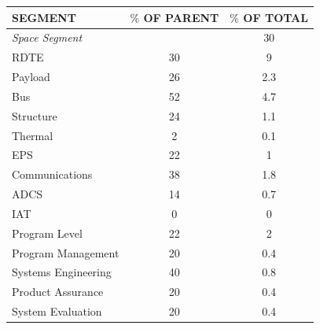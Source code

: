 \begin{table}[htbp]
	\centering

\begin{tabular}{p{10cm} | c | c }

   \textbf{SEGMENT} & \textbf{$\%$ OF PARENT} & \textbf{$\%$ OF TOTAL} \\ \hline \hline

\textsl{Space Segment} &          &       30   \\ \hline

      \hspace{1.0cm}RDTE &         30 &   9       \\ \hline

   \hspace{2.0cm}Payload &         26 &     2.3     \\

       \hspace{2.0cm}Bus &         52 &     4.7    \\ \hline

 \hspace{2.5cm}Structure &         24&      1.1    \\

  \hspace{2.5cm}Thermal &         2 &       0.1   \\

      \hspace{2.5cm}EPS &         22 &      1    \\

\hspace{2.5cm}Communications &         38 &      1.8    \\

      \hspace{2.5cm}ADCS &         14 &     0.7     \\ \hline

       \hspace{2.0cm}IAT &         0 &         0 \\

 \hspace{2.0cm}Program Level &         22 &       2   \\ \hline
 \hspace{2.5cm}Program Management &         20 &      0.4    \\
 \hspace{2.5cm}Systems Engineering &         40 &     0.8     \\
 \hspace{2.5cm}Product Assurance &         20 &       0.4   \\
 \hspace{2.5cm}System Evaluation &         20 &       0.4   \\ \hline


\end{tabular}
\end{table}
